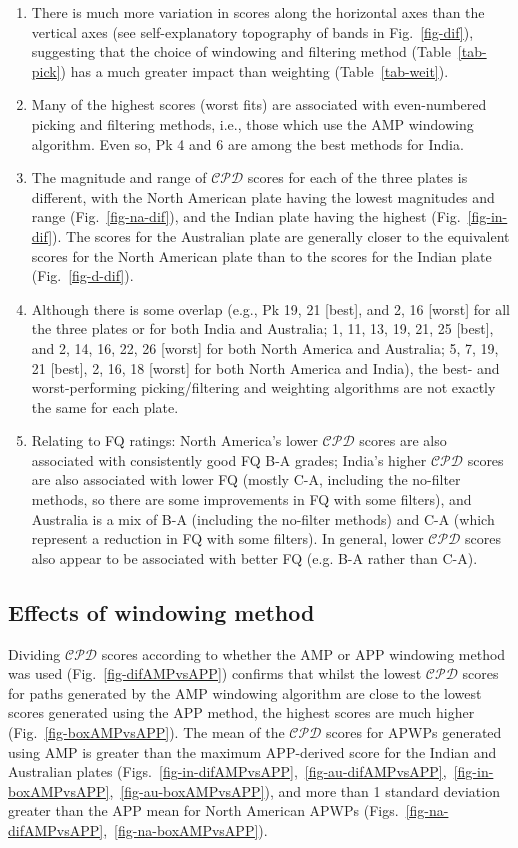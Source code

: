\begin{enumerate}
  \item There is much more variation in scores along the horizontal axes than
	the vertical axes (see self-explanatory topography of bands in
	Fig.~\ref{fig-dif}), suggesting that the choice of windowing and filtering
	method (Table~\ref{tab-pick}) has a much greater impact than weighting
	(Table~\ref{tab-weit}).
  \item Many of the highest scores (worst fits) are associated with
	even-numbered picking and filtering methods, i.e., those which use the AMP
	windowing algorithm. Even so, Pk 4 and 6 are among the best methods for
	India.
  \item The magnitude and range of $\mathcal{CPD}$ scores for each of the three
	plates is different, with the North American plate having the lowest
	magnitudes and range (Fig.~\ref{fig-na-dif}), and the Indian plate having
	the highest (Fig.~\ref{fig-in-dif}). The scores for the Australian plate are
	generally closer to the equivalent scores for the North American plate than
	to the scores for the Indian plate (Fig.~\ref{fig-d-dif}).
  \item Although there is some overlap (e.g., Pk 19, 21 [best], and
	2, 16 [worst] for all the three plates or for both India and Australia; 1,
	11, 13, 19, 21, 25 [best], and 2, 14, 16, 22, 26 [worst] for both North
	America and Australia; 5, 7, 19, 21 [best], 2, 16, 18 [worst] for both North
	America and India), the best- and worst-performing picking/filtering and
	weighting algorithms are not exactly the same for each plate.
  \item Relating to FQ ratings: North America's lower $\mathcal{CPD}$ scores are
	also associated with consistently good FQ B-A grades; India's higher
	$\mathcal{CPD}$ scores are also associated with lower FQ (mostly C-A,
	including the no-filter methods, so there are some improvements in FQ with
	some filters), and Australia is a mix of B-A (including the no-filter
	methods) and C-A (which represent a reduction in FQ with some filters). In
	general, lower $\mathcal{CPD}$ scores also appear to be associated with
	better FQ (e.g. B-A rather than C-A).
\end{enumerate}

\subsection{Effects of windowing method}

Dividing $\mathcal{CPD}$ scores according to whether the AMP or APP windowing
method was used (Fig.~\ref{fig-difAMPvsAPP}) confirms that whilst the lowest
$\mathcal{CPD}$ scores for paths generated by the AMP windowing algorithm are
close to the lowest scores generated using the APP method, the highest scores
are much higher (Fig.~\ref{fig-boxAMPvsAPP}). The mean of the $\mathcal{CPD}$
scores for APWPs generated using AMP is greater than the maximum APP-derived
score for the Indian and Australian plates
(Figs.~\ref{fig-in-difAMPvsAPP},~\ref{fig-au-difAMPvsAPP},~\ref{fig-in-boxAMPvsAPP},~\ref{fig-au-boxAMPvsAPP}),
and more than 1 standard deviation greater than the APP mean for North American
APWPs (Figs.~\ref{fig-na-difAMPvsAPP},~\ref{fig-na-boxAMPvsAPP}).

